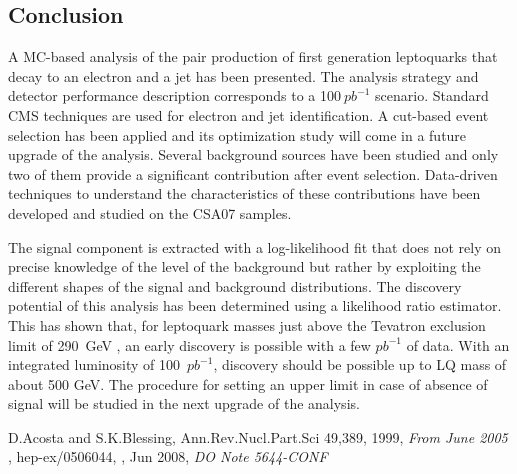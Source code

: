\documentclass[colclass=cmspaper]{combine}
\begin{document}
\begin{linenumbers}
\section{Conclusion}

A MC-based analysis of the pair production of first generation leptoquarks that decay to
an electron and a jet has been presented.
The analysis strategy and detector performance description corresponds to a 100$~pb^{-1}$ scenario.
Standard CMS techniques are used for electron and jet identification. 
A cut-based event selection has been applied and its optimization study will come in a future upgrade
of the analysis.
Several background sources have been studied and only two of them provide a significant contribution
after event selection. 
Data-driven techniques to understand the characteristics of these contributions have been developed 
and studied on the CSA07 samples.

The signal component is extracted with a log-likelihood fit that does not rely on precise knowledge
of the level of the background but rather by exploiting the different shapes of the signal and background
distributions. 
The discovery potential of this analysis has been determined using a likelihood ratio estimator. 
This has shown that, for leptoquark masses just above the Tevatron exclusion limit of 290~GeV
\cite{d02008}, an early discovery is possible with a few $pb^{-1}$ of data.
With an integrated luminosity of 100~$pb^{-1}$, discovery should be possible up
to LQ mass of about 500 GeV.
The procedure for setting an upper limit in case of absence of signal will be studied 
in the next upgrade of the analysis.










\begin{thebibliography}{9}
   {D.Acosta and S.K.Blessing, Ann.Rev.Nucl.Part.Sci 49,389},
    1999,
    {\em From June 2005}
  , hep-ex/0506044,
  , Jun 2008,
  {\em DO Note 5644-CONF}


\end{thebibliography}
\end{linenumbers}
\end{document}
